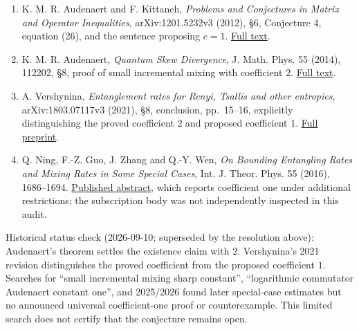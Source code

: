 \documentclass[11pt,a4paper]{article}
\begin{document}
\begin{enumerate}
\def\labelenumi{\arabic{enumi}.}
\item
  K. M. R. Audenaert and F. Kittaneh, \emph{Problems and Conjectures in
  Matrix and Operator Inequalities}, arXiv:1201.5232v3 (2012), §6,
  Conjecture 4, equation (26), and the sentence proposing \(c=1\).
  \href{https://arxiv.org/html/1201.5232}{Full text}.
\item
  K. M. R. Audenaert, \emph{Quantum Skew Divergence}, J. Math. Phys. 55
  (2014), 112202, §8, proof of small incremental mixing with coefficient
  \(2\). \href{https://arxiv.org/html/1304.5935}{Full text}.
\item
  A. Vershynina, \emph{Entanglement rates for Renyi, Tsallis and other
  entropies}, arXiv:1803.07117v3 (2021), §8, conclusion, pp.~15--16,
  explicitly distinguishing the proved coefficient \(2\) and proposed
  coefficient \(1\). \href{https://arxiv.org/pdf/1803.07117}{Full
  preprint}.
\item
  Q. Ning, F.-Z. Guo, J. Zhang and Q.-Y. Wen, \emph{On Bounding
  Entangling Rates and Mixing Rates in Some Special Cases}, Int. J.
  Theor. Phys. 55 (2016), 1686--1694.
  \href{https://doi.org/10.1007/s10773-015-2806-9}{Published abstract},
  which reports coefficient one under additional restrictions; the
  subscription body was not independently inspected in this audit.
\end{enumerate}

Historical status check (2026-09-10; superseded by the resolution
above): Audenaert's theorem settles the existence claim with \(2\).
Vershynina's 2021 revision distinguishes the proved coefficient from the
proposed coefficient \(1\). Searches for ``small incremental mixing
sharp constant'', ``logarithmic commutator Audenaert constant one'', and
2025/2026 found later special-case estimates but no announced universal
coefficient-one proof or counterexample. This limited search does not
certify that the conjecture remains open.
\end{document}
